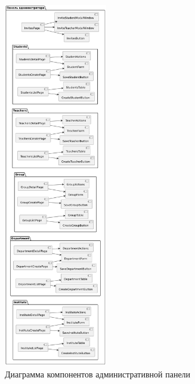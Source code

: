   
\begin{figure}[H]
	\centering
	\includegraphics[width=0.4\textwidth]{static/diagrams/AdminComponentDiagram.png}
	\caption{Диаграмма компонентов административной панели}
	\label{fig:admin-components}
\end{figure}

